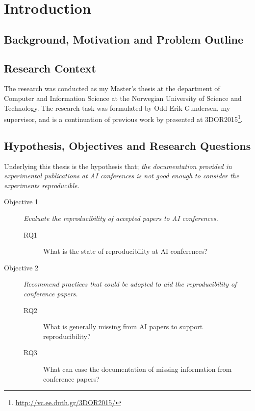 
\chapter{Introduction}

\section{Background, Motivation and Problem Outline}
\section{Research Context}
The research was conducted as my Master's thesis at the department of Computer and Information Science at the Norwegian University of Science and Technology. The research task was formulated by Odd Erik Gundersen, my supervisor, and is a continuation of previous work by \citet{3dor.20151059} presented at 3DOR2015\footnote{\url{http://vc.ee.duth.gr/3DOR2015/}}.

\section{Hypothesis, Objectives and Research Questions}
Underlying this thesis is the hypothesis that; \textit{the documentation provided in experimental publications at AI conferences is not good enough to consider the experiments reproducible.}

\begin{description}
    \item[Objective 1] \textit{Evaluate the reproducibility of accepted papers to AI conferences.}
        \begin{description}
            \item[RQ1] What is the state of reproducibility at AI conferences?
        \end{description}
    \item[Objective 2] \textit{Recommend practices that could be adopted to aid the reproducibility of conference papers.}
        \begin{description}
            \item[RQ2] What is generally missing from AI papers to support reproducibility?
            \item[RQ3] What can ease the documentation of missing information from conference papers?
        \end{description}
\end{description}

